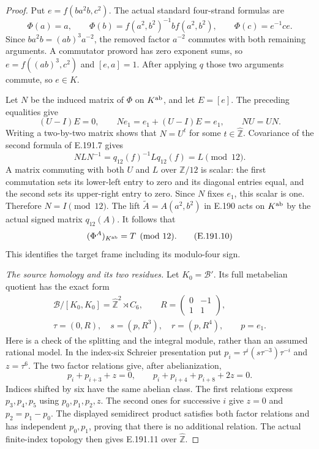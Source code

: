 \begin{proof}
Put \(e=f(ba^2b,c^2)\).  The actual standard
four-strand formulas are
\[
 \Phi(a)=a,\qquad
 \Phi(b)=f(a^2,b^2)^{-1}b f(a^2,b^2),\qquad
 \Phi(c)=e^{-1}ce .
\tag{E.191.7}
\]
Since \(ba^2b=(ab)^3a^{-2}\), the removed
factor \(a^{-2}\) commutes with both remaining
arguments.  A commutator proword has zero
exponent sums, so
\(e=f((ab)^3,c^2)\) and \([e,a]=1\).
After applying \(q\) those two arguments commute,
so \(e\in K\).

Let \(N\) be the induced matrix of \(\Phi\) on
\(K^{\rm ab}\), and let \(E=[e]\).
The preceding equalities give
\[
       (U-I)E=0,\qquad
       Ne_1=e_1+(U-I)E=e_1,\qquad NU=UN .
\tag{E.191.8}
\]
Writing a two-by-two matrix shows that \(N=U^t\)
for some \(t\in\widehat{\mathbb Z}\).
Covariance of the second formula of E.191.7 gives
\[
 NLN^{-1}
       =q_{12}(f)^{-1}Lq_{12}(f)=L\pmod{12}.
\tag{E.191.9}
\]
A matrix commuting with both \(U\) and \(L\)
over \(\mathbb Z/12\) is scalar: the first
commutation sets its lower-left entry to zero
and its diagonal entries equal, and the second
sets its upper-right entry to zero.
Since \(N\) fixes \(e_1\), this scalar is one.
Therefore \(N=I\pmod{12}\).
The lift \(\widetilde A=A(a^2,b^2)\) in E.190
acts on \(K^{\rm ab}\) by the actual signed
matrix \(q_{12}(A)\).  It follows that
\[
              (\Phi^A)_{K^{\rm ab}}=T\pmod{12}.
\tag{E.191.10}
\]
This identifies the target frame including its
modulo-four sign.

\emph{The source homology and its two residues.}
Let \(K_0=\mathcal B'\).  Its full metabelian
quotient has the exact form
\[
 \begin{gathered}
 \mathcal B/[K_0,K_0]
      =\widehat{\mathbb Z}^2\rtimes C_6,\qquad
 R=\begin{pmatrix}0&-1\\1&1\end{pmatrix},\\
 \tau=(0,R),\quad s=(p,R^3),\quad
 r=(p,R^4),\qquad p=e_1 .
 \end{gathered}
\tag{E.191.11}
\]
Here is a check of the splitting and the integral
module, rather than an assumed rational model.
In the index-six Schreier presentation put
\(p_i=\tau^i(s\tau^{-3})\tau^{-i}\) and
\(z=\tau^6\).  The two factor relations give,
after abelianization,
\[
 p_i+p_{i+3}+z=0,\qquad
 p_i+p_{i+4}+p_{i+8}+2z=0 .
\tag{E.191.12}
\]
Indices shifted by six have the same abelian
class.  The first relations express \(p_3,p_4,p_5\)
using \(p_0,p_1,p_2,z\).  The second ones for
successive \(i\) give \(z=0\) and
\(p_2=p_1-p_0\).  The displayed semidirect
product satisfies both factor relations and
has independent \(p_0,p_1\), proving that there
is no additional relation.
The actual finite-index topology then gives
E.191.11 over \(\widehat{\mathbb Z}\).


\end{proof}
